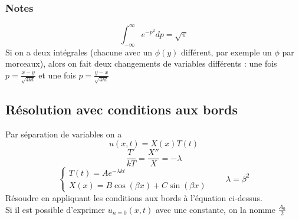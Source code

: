 \documentclass[resume]{subfiles}
\begin{document}
\subsubsection{Notes}
$$\int_{-\infty}^{\infty}e^{-p^2}dp=\sqrt{\pi}$$
Si on a deux intégrales (chacune avec un $\phi(y)$ différent, par exemple un $\phi$ par morceaux), alors on fait deux changements de variables différents : une fois $p=\frac{x-y}{\sqrt{4kt}}$ et une fois $p=\frac{y-x}{\sqrt{4kt}}$
\subsection{Résolution avec conditions aux bords}
Par séparation de variables on a 
$$u(x,t)=X(x)T(t)$$
$$\frac{T'}{kT}=\frac{X''}{X}=-\lambda$$
$$\begin{cases} T(t)=Ae^{-\lambda kt}\\
X(x)=B\cos(\beta x)+C\sin(\beta x)\end{cases}\qquad \lambda=\beta^2$$
Résoudre en appliquant les conditions aux bords à l'équation ci-dessus.\\
Si il est possible d'exprimer $u_{n=0}(x,t)$ avec une constante, on la nomme $\frac{A_0}{2}$
\end{document}
